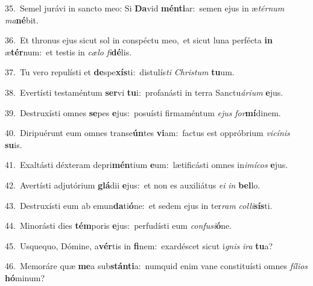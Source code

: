 {\numbfont\textcolor{\numbcolor}{35.}}~Semel jurávi in sancto meo: Si \textbf{Da}\-vid \textbf{mén}\-\textbf{ti}ar:~\star semen ejus in æ\-\textit{tér}\-\textit{num} \textit{ma}\-\textbf{né}bit.\par
{\numbfont\textcolor{\numbcolor}{36.}}~Et thronus ejus sicut sol in conspéctu meo,~\dagger et sicut luna perfécta \textbf{in} æ\-\textbf{tér}\-num:~\star et testis in \textit{cæ}\-\textit{lo} \textit{fi}\-\textbf{dé}lis.\par
{\numbfont\textcolor{\numbcolor}{37.}}~Tu vero repulísti et \textbf{de}\-spe\-\textbf{xís}\-ti:~\star distulís\textit{ti} \textit{Chris}\-\textit{tum} \textbf{tu}\-um.\par
{\numbfont\textcolor{\numbcolor}{38.}}~Evertísti testaméntum \textbf{ser}\-vi \textbf{tu}\-i:~\star profanásti in terra Sanctu\-\textit{á}\-\textit{ri}\textit{um} \textbf{e}\-jus.\par
{\numbfont\textcolor{\numbcolor}{39.}}~Destruxísti omnes \textbf{se}\-pes \textbf{e}\-jus:~\star posuísti firmaméntum \textit{e}\-\textit{jus} \textit{for}\-\textbf{mí}dinem.\par
{\numbfont\textcolor{\numbcolor}{40.}}~Diripuérunt eum omnes transe\-\textbf{ún}\-tes \textbf{vi}\-am:~\star factus est oppróbrium \textit{vi}\-\textit{cí}\textit{nis} \textbf{su}\-is.\par
{\numbfont\textcolor{\numbcolor}{41.}}~Exaltásti déxteram depri\-\textbf{mén}\-tium \textbf{e}\-um:~\star lætificásti omnes in\-\textit{i}\-\textit{mí}\textit{cos} \textbf{e}\-jus.\par
{\numbfont\textcolor{\numbcolor}{42.}}~Avertísti adjutórium \textbf{glá}\-dii \textbf{e}\-jus:~\star et non es auxiliátus \textit{e}\-\textit{i} \textit{in} \textbf{bel}\-lo.\par
{\numbfont\textcolor{\numbcolor}{43.}}~Destruxísti eum ab emun\-\textbf{da}\-ti\-\textbf{ó}\-ne:~\star et sedem ejus in ter\textit{ram} \textit{col}\-\textit{li}\textbf{sís}ti.\par
{\numbfont\textcolor{\numbcolor}{44.}}~Minorásti dies \textbf{tém}\-poris \textbf{e}\-jus:~\star perfudísti eum \textit{con}\-\textit{fu}\textit{si}\textbf{ó}ne.\par
{\numbfont\textcolor{\numbcolor}{45.}}~Usquequo, Dómine, a\-\textbf{vér}\-tis in \textbf{fi}\-nem:~\star exardéscet sicut i\textit{gnis} \textit{i}\-\textit{ra} \textbf{tu}\-a?\par
{\numbfont\textcolor{\numbcolor}{46.}}~Memoráre quæ \textbf{me}\-a sub\-\textbf{stán}\-\textbf{ti}a:~\star numquid enim vane constituísti omnes \textit{fí}\-\textit{li}\textit{os} \textbf{hó}\-minum?\par
